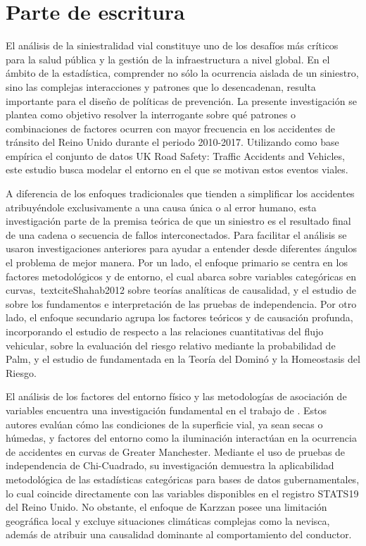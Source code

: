 \documentclass[12pt]{article}
\begin{document}
\section{Parte de escritura}

El análisis de la siniestralidad vial constituye uno de los desafíos más críticos para la salud pública y la gestión de la infraestructura a nivel global. En el ámbito de la estadística, comprender no sólo la ocurrencia aislada de un siniestro, sino las complejas interacciones y patrones que lo desencadenan, resulta importante para el diseño de políticas de prevención. La presente investigación se plantea como objetivo resolver la interrogante sobre qué patrones o combinaciones de factores ocurren con mayor frecuencia en los accidentes de tránsito del Reino Unido durante el periodo 2010-2017. Utilizando como base empírica el conjunto de datos UK Road Safety: Traffic Accidents and Vehicles, este estudio busca modelar el entorno en el que se motivan estos eventos viales.

A diferencia de los enfoques tradicionales que tienden a simplificar los accidentes atribuyéndole exclusivamente a una causa única o al error humano, esta investigación parte de la premisa teórica de que un siniestro es el resultado final de una cadena o secuencia de fallos interconectados. Para facilitar el análisis se usaron investigaciones anteriores para ayudar a entender desde diferentes ángulos el problema de mejor manera. Por un lado, el enfoque primario se centra en los factores metodológicos y de entorno, el cual abarca \textcite{KARZAN2017} sobre variables categóricas en curvas,\ textcite{Shahab2012} sobre teorías analíticas de causalidad, y el estudio de \textcite{McHugh2013} sobre los fundamentos e interpretación de las pruebas de independencia. Por otro lado, el enfoque secundario agrupa los factores teóricos y de causación profunda, incorporando el estudio de \textcite{TAYLOR2000}  respecto a las relaciones cuantitativas del flujo vehicular, \textcite{MALIN2019}  sobre la evaluación del riesgo relativo mediante la probabilidad de Palm, y el estudio de \textcite{SAXENA2017} fundamentada en la Teoría del Dominó y la Homeostasis del Riesgo.

El análisis de los factores del entorno físico y las metodologías de asociación de variables encuentra una investigación fundamental en el trabajo de \textcite{KARZAN2017}. Estos autores evalúan cómo las condiciones de la superficie vial, ya sean secas o húmedas, y factores del entorno como la iluminación interactúan en la ocurrencia de accidentes en curvas de Greater Manchester. Mediante el uso de pruebas de independencia de Chi-Cuadrado, su investigación demuestra la aplicabilidad metodológica de las estadísticas categóricas para bases de datos gubernamentales, lo cual coincide directamente con las variables disponibles en el registro STATS19 del Reino Unido. No obstante, el enfoque de Karzzan posee una limitación geográfica local y excluye situaciones climáticas complejas como la nevisca, además de atribuir una causalidad dominante al comportamiento del conductor.
\end{document}
